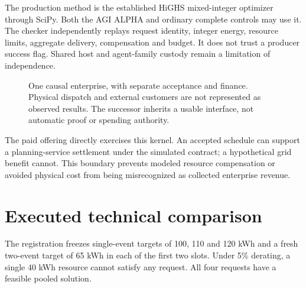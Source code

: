 \documentclass[10pt,a4paper]{article}
\begin{document}
The production method is the established HiGHS mixed-integer optimizer through SciPy. Both the AGI ALPHA and ordinary complete controls may use it. The checker independently replays request identity, integer energy, resource limits, aggregate delivery, compensation and budget. It does not trust a producer success flag. Shared host and agent-family custody remain a limitation of independence.

\begin{figure}[h]
\centering
{}
\caption{One causal enterprise, with separate acceptance and finance. Physical dispatch and external customers are not represented as observed results. The successor inherits a usable interface, not automatic proof or spending authority.}
\end{figure}

The paid offering directly exercises this kernel. An accepted schedule can support a planning-service settlement under the simulated contract; a hypothetical grid benefit cannot. This boundary prevents modeled resource compensation or avoided physical cost from being misrecognized as collected enterprise revenue.
\newpage

\section{Executed technical comparison}
The registration freezes single-event targets of 100, 110 and 120 kWh and a fresh two-event target of 65 kWh in each of the first two slots. Under 5\% derating, a single 40 kWh resource cannot satisfy any request. All four requests have a feasible pooled solution.
\end{document}
